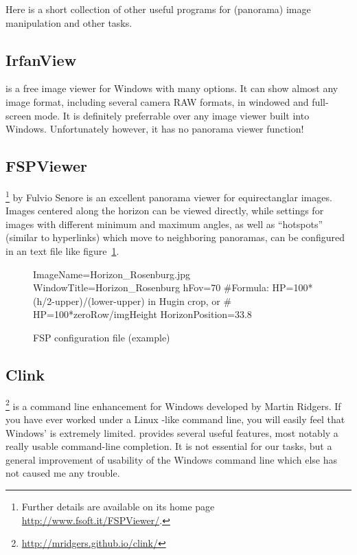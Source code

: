 Here is a short collection of other useful programs for (panorama)
image manipulation and other tasks.


\subsection{IrfanView}
\label{sec:landscapes:IrfanView}

 is a free image viewer for Windows with many
options. It can show almost any image format, including several camera
RAW formats, in windowed and full-screen mode. It is definitely
preferrable over any image viewer built into Windows. Unfortunately
however, it has no panorama viewer function!

\subsection{FSPViewer}
\label{sec:landscapes:FSPViewer}

\footnote{Further details are available on its home
  page \url{http://www.fsoft.it/FSPViewer/}.} by Fulvio
Senore is an excellent panorama viewer for equirectanglar
images. Images centered along the horizon can be viewed directly,
while settings for images with different minimum and maximum angles,
as well as ``hotspots'' (similar to hyperlinks) which move to
neighboring panoramas, can be configured in an  text file
like figure~\ref{fig:FSPexample}.


\begin{figure}[h]\centering
\begin{configfile}
ImageName=Horizon_Rosenburg.jpg
WindowTitle=Horizon_Rosenburg 
hFov=70 
#Formula: HP=100*(h/2-upper)/(lower-upper) in Hugin crop, or
#         HP=100*zeroRow/imgHeight 
HorizonPosition=33.8
\end{configfile}
\caption{FSP configuration file (example)}
\label{fig:FSPexample}
\end{figure}

\subsection{Clink}
\label{sec:landscapes:clink}

\footnote{\url{http://mridgers.github.io/clink/}} is a command
line enhancement for Windows developed by Martin Ridgers. If you have
ever worked under a Linux -like command line, you will
easily feel that Windows'  is extremely limited. 
provides several useful features, most notably a really usable
command-line completion. It is not essential for our tasks, but a
general improvement of usability of the Windows command line which
else has not caused me any trouble.

